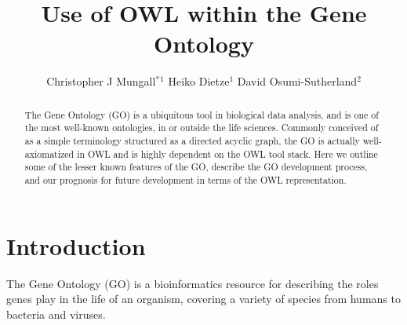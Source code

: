 \documentclass{llncs}
\def\correspondingauthor{$^*$}
\begin{document}
%
\frontmatter          %

\title{Use of OWL within the Gene Ontology}
\author{
Christopher J Mungall\correspondingauthor$^{1}$
Heiko Dietze$^{1}$
David Osumi-Sutherland$^{2}$
}



\maketitle              %

\begin{abstract}

The Gene Ontology (GO) is a ubiquitous tool in biological data
analysis, and is one of the most well-known ontologies, in or outside
the life sciences. Commonly conceived of as a simple terminology
structured as a directed acyclic graph, the GO is actually
well-axiomatized in OWL and is highly dependent on the OWL tool
stack. Here we outline some of the lesser known features of the GO,
describe the GO development process, and our prognosis for future
development in terms of the OWL representation.

\end{abstract}

\section{Introduction}


The Gene Ontology (GO) is a bioinformatics resource for describing the
roles genes play in the life of an organism, covering a variety of
species from humans to bacteria and viruses\cite{Ashburner2000}.
\end{document}

